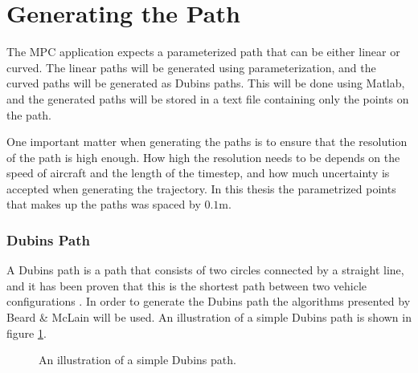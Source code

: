 \section{Generating the Path}

The MPC application expects a parameterized path that can be either linear or curved. The linear paths will be generated using parameterization, and the curved paths will be generated as Dubins paths. This will be done using Matlab, and the generated paths will be stored in a text file containing only the points on the path.

One important matter when generating the paths is to ensure that the resolution of the path is high enough. How high the resolution needs to be depends on the speed of aircraft and the length of the timestep, and how much uncertainty is accepted when generating the trajectory. In this thesis the parametrized points that makes up the paths was spaced by $0.1$m.


\subsubsection{Dubins Path}

A Dubins path is a path that consists of two circles connected by a straight line, and it has been proven that this is the shortest path between two vehicle configurations \cite{DUBINS}. In order to generate the Dubins path the algorithms presented by Beard \& McLain \cite{uavBEARD} will be used. An illustration of a simple Dubins path is shown in figure \ref{fig:dubins}.

\begin{figure}[h]
	\centering
	\caption{An illustration of a simple Dubins path.}
	\label{fig:dubins}
\end{figure}